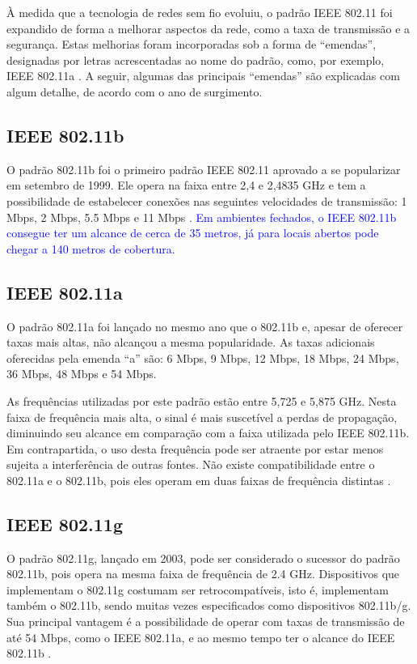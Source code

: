 À medida que a tecnologia de redes sem fio evoluiu, o padrão IEEE 802.11 foi expandido de forma a melhorar aspectos da rede, como a taxa de transmissão e a segurança. Estas melhorias foram incorporadas sob a forma de ``emendas'', designadas por letras acrescentadas ao nome do padrão, como, por exemplo, IEEE 802.11a \cite{fluminense2010}. A seguir, algumas das principais ``emendas'' são explicadas com algum detalhe, de acordo com o ano de surgimento.

\subsection{IEEE 802.11b}
\label{subsec:802-11b}

O padrão 802.11b foi o primeiro padrão IEEE 802.11 aprovado a se popularizar em setembro de 1999. Ele opera na faixa entre 2,4 e 2,4835 GHz e tem a possibilidade de estabelecer conexões nas seguintes velocidades de transmissão: 1 Mbps, 2 Mbps, 5.5 Mbps e 11 Mbps \cite{moraes2010,fluminense2010}. \textcolor{blue}{Em ambientes fechados, o IEEE 802.11b consegue ter um alcance de cerca de 35 metros, já para locais abertos pode chegar a 140 metros de cobertura.}

\subsection{IEEE 802.11a}
\label{802-11a}

O padrão 802.11a foi lançado no mesmo ano que o 802.11b e, apesar de oferecer taxas mais altas, não alcançou a mesma popularidade. As taxas adicionais oferecidas pela emenda “a” são: 6 Mbps, 9 Mbps, 12 Mbps, 18 Mbps, 24 Mbps, 36 Mbps, 48 Mbps e 54 Mbps.

As frequências utilizadas por este padrão estão entre 5,725 e 5,875 GHz. Nesta faixa de frequência mais alta, o sinal é mais suscetível a perdas de propagação, diminuindo seu alcance em comparação com a faixa utilizada pelo IEEE 802.11b. Em contrapartida, o uso desta frequência pode ser atraente por estar menos sujeita a interferência de outras fontes. Não existe compatibilidade entre o 802.11a e o 802.11b, pois eles operam em duas faixas de frequência distintas \cite{moraes2010,fluminense2010}.

\subsection{IEEE 802.11g}
\label{subsec:802-11g}

O padrão 802.11g, lançado em 2003, pode ser considerado o sucessor do padrão 802.11b, pois opera na mesma faixa de frequência de 2.4 GHz. Dispositivos que implementam o 802.11g costumam ser retrocompatíveis, isto é, implementam também o 802.11b, sendo muitas vezes especificados como dispositivos 802.11b/g. Sua principal vantagem é a possibilidade de operar com taxas de transmissão de até 54 Mbps, como o IEEE 802.11a, e ao mesmo tempo ter o alcance do IEEE 802.11b \cite{moraes2010,fluminense2010}.

